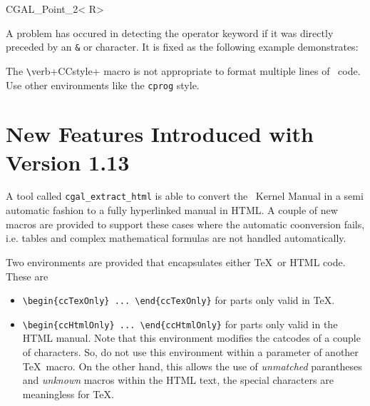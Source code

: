 \documentclass[12pt]{article}
\begin{document}
\begin{ccClassTemplate}{CGAL_Point_2< R>}
\end{ccClassTemplate}

A problem has occured in detecting the operator keyword if it was
directly preceded by an {\tt \&} or {\tt *} character. It is fixed as
the following example demonstrates:


%
%

The \verb+\+verb+CCstyle+ macro is not appropriate to format multiple lines
of \CC\ code. Use other environments like the {\tt cprog} style.


\section{New Features Introduced with Version 1.13}

A tool called {\tt cgal\_extract\_html} is able to convert the \cgal\
Kernel Manual in a semi automatic fashion to a fully hyperlinked
manual in HTML. A couple of new macros are provided to support these
cases where the automatic coonversion fails, i.e. tables and complex
mathematical formulas are not handled automatically.

Two environments are provided that encapsulates either \TeX\ or HTML
code. These are 

\begin{itemize}
    \item
        \verb+\begin{ccTexOnly} ... \end{ccTexOnly}+ for parts only valid
        in \TeX.
    \item
        \verb+\begin{ccHtmlOnly} ... \end{ccHtmlOnly}+ for parts only valid
        in the HTML manual. Note that this environment modifies the 
        catcodes of a couple of characters. So, do not use this
        environment within a parameter of another \TeX\ macro. On the
        other hand, this allows the use of {\em unmatched} parantheses
        and {\em unknown} macros within the HTML text, the special
        characters are meaningless for \TeX.
\end{itemize}
\end{document}
